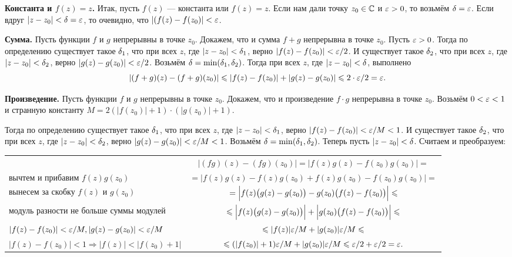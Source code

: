 \documentclass[a4paper, 12pt]{article}
\begin{document}
\bigskip

\textbf{Константа и $f(z)=z$.}
Итак, пусть $f(z)$ — константа или $f(z)=z$.
Если нам дали точку $z_0\in\mathbb{C}$ и $\varepsilon>0$, то возьмём $\delta=\varepsilon$.
Если вдруг $|z-z_0|<\delta=\varepsilon$, то очевидно, что $|(f(z) - f(z_0)|<\varepsilon$.

\bigskip

\textbf{Сумма.}
Пусть функции $f$ и $g$ непрерывны в точке $z_0$. Докажем, что и сумма $f+g$ непрерывна в точке $z_0$.
Пусть $\varepsilon>0$.
Тогда по определению существует такое $\delta_1$, что при всех $z$, где $|z-z_0|<\delta_1$, верно $|f(z)-f(z_0)|<\varepsilon/2$.
И существует такое $\delta_2$, что при всех $z$, где $|z-z_0|<\delta_2$, верно $|g(z)-g(z_0)|<\varepsilon/2$.
Возьмём $\delta = \min(\delta_1, \delta_2)$.
Тогда при всех $z$, где $|z-z_0|<\delta$, выполнено
$$|(f+g)(z)-(f+g)(z_0)| \leqslant |f(z)-f(z_0)|+|g(z)-g(z_0)|\leqslant 2\cdot\varepsilon/2 = \varepsilon.$$

\bigskip

\textbf{Произведение.}
Пусть функции $f$ и $g$ непрерывны в точке $z_0$. Докажем, что и произведение $f\cdot g$ непрерывна в точке $z_0$.
Возьмём $0<\varepsilon<1$ и странную константу $M=2(|f(z_0)| + 1)\cdot(|g(z_0)| + 1)$.

Тогда по определению существует такое $\delta_1$, что при всех $z$, где $|z-z_0|<\delta_1$, верно $|f(z)-f(z_0)|<\varepsilon/M<1$.
И существует такое $\delta_2$, что при всех $z$, где $|z-z_0|<\delta_2$, верно $|g(z)-g(z_0)|<\varepsilon/M<1$.
Возьмём $\delta = \min(\delta_1, \delta_2)$.
Теперь пусть $|z-z_0|<\delta$. Считаем и преобразуем:

\noindent
\begin{tabular}{p{8.6cm}c}
  & \rule{0pt}{20pt}
  $|(fg)(z) - (fg)(z_0)| = |f(z)g(z) - f(z_0)g(z_0)| = $
  \\
  вычтем и прибавим $f(z)g(z_0)$
  &  \rule{0pt}{20pt}
  $ = |f(z)g(z) - f(z)g(z_0) + f(z)g(z_0) - f(z_0)g(z_0)| = $
  \\
  вынесем за скобку $f(z)$ и $g(z_0)$
  &  \rule{0pt}{20pt}
  $ = \Bigl|f(z)\bigl(g(z)-g(z_0)\bigr) - g(z_0) \bigl(f(z)-f(z_0)\bigr)\Bigr| \leqslant $
  \\
  модуль разности не больше суммы модулей
  &  \rule{0pt}{20pt}
  $ \leqslant \Bigl|f(z)\bigl(g(z)-g(z_0)\bigr)\Bigr| + \Bigl|g(z_0) \bigl(f(z)-f(z_0)\bigr)\Bigr| \leqslant $
  \\
  $|f(z)-f(z_0)|<\varepsilon/M, |g(z)-g(z_0)|<\varepsilon/M$
  & \rule{0pt}{20pt}
  $ \leqslant |f(z)|\varepsilon/M + |g(z_0)| \varepsilon/M \leqslant $
  \\
  $|f(z)-f(z_0)|<1 \Rightarrow |f(z)|<|f(z_0)+1|$
  &  \rule{0pt}{20pt}
  $ \leqslant (|f(z_0)|+1)\varepsilon/M + |g(z_0)|\varepsilon/M \leqslant \varepsilon/2 + \varepsilon/2 = \varepsilon.$
\end{tabular}
\end{document}
